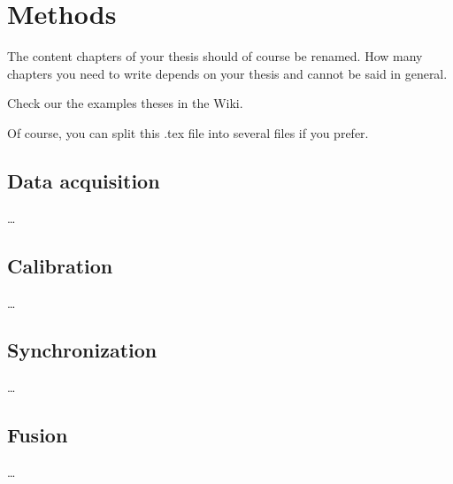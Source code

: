 
\chapter{Methods}
\label{ch:methods}

The content chapters of your thesis should of course be renamed. How many chapters you need to write depends on your thesis and cannot be said in general. 

Check our the examples theses in the Wiki. 

Of course, you can split this .tex file into several files if you prefer. 


\section{Data acquisition}
\label{sec:acq}

\dots


\section{Calibration}
\label{sec:cal}

\dots

\section{Synchronization}
\label{sec:sync}

\dots

\section{Fusion}
\label{sec:fusion}

\dots

